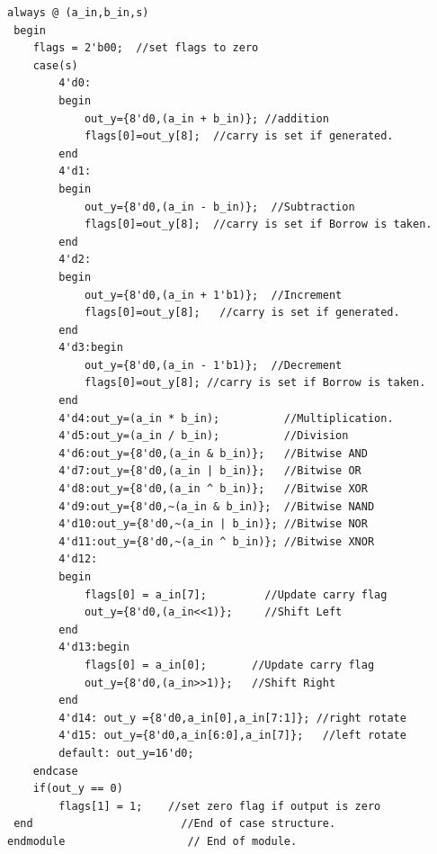 \documentclass[12pt,singleside,a4paper]{article}
\begin{document}
 \begin{lstlisting}[style=verilog-style]
 always @ (a_in,b_in,s)  
 begin
    flags = 2'b00;  //set flags to zero
    case(s)
        4'd0:
        begin
            out_y={8'd0,(a_in + b_in)}; //addition
            flags[0]=out_y[8];  //carry is set if generated.
        end	
        4'd1:
        begin
            out_y={8'd0,(a_in - b_in)};	 //Subtraction
            flags[0]=out_y[8];  //carry is set if Borrow is taken.
        end 
        4'd2:
        begin 
            out_y={8'd0,(a_in + 1'b1)};	 //Increment
            flags[0]=out_y[8];   //carry is set if generated.
        end
        4'd3:begin
            out_y={8'd0,(a_in - 1'b1)};	 //Decrement
            flags[0]=out_y[8]; //carry is set if Borrow is taken.
        end
        4'd4:out_y=(a_in * b_in);          //Multiplication.
        4'd5:out_y=(a_in / b_in);		   //Division
        4'd6:out_y={8'd0,(a_in & b_in)};   //Bitwise AND
        4'd7:out_y={8'd0,(a_in | b_in)};   //Bitwise OR
        4'd8:out_y={8'd0,(a_in ^ b_in)};   //Bitwise XOR
        4'd9:out_y={8'd0,~(a_in & b_in)};  //Bitwise NAND
        4'd10:out_y={8'd0,~(a_in | b_in)}; //Bitwise NOR
        4'd11:out_y={8'd0,~(a_in ^ b_in)}; //Bitwise XNOR
        4'd12:
        begin
            flags[0] = a_in[7];         //Update carry flag
            out_y={8'd0,(a_in<<1)};     //Shift Left
        end	
        4'd13:begin
            flags[0] = a_in[0];       //Update carry flag
            out_y={8'd0,(a_in>>1)};   //Shift Right
        end
        4'd14: out_y ={8'd0,a_in[0],a_in[7:1]}; //right rotate
        4'd15: out_y={8'd0,a_in[6:0],a_in[7]};   //left rotate
        default: out_y=16'd0;
	endcase
    if(out_y == 0)
        flags[1] = 1;    //set zero flag if output is zero
 end                       //End of case structure. 
endmodule					// End of module.
\end{lstlisting}
\newpage
\end{document}
